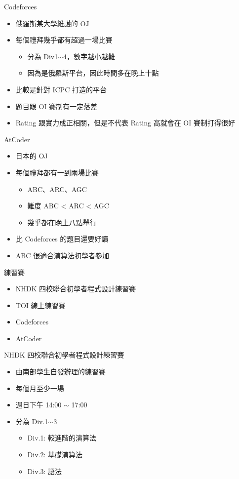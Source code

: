 \documentclass[aspectratio=169]{beamer}
\begin{document}
	\begin{frame}{Codeforces}
		\begin{itemize}
			\item 俄羅斯某大學維護的 OJ
			\item 每個禮拜幾乎都有超過一場比賽
				\begin{itemize}
					\item 分為 Div1$\sim$4，數字越小越難
					\item 因為是俄羅斯平台，因此時間多在晚上十點
				\end{itemize}
			\item 比較是針對 ICPC 打造的平台
			\item 題目跟 OI 賽制有一定落差 
			\item Rating 跟實力成正相關，但是不代表 Rating 高就會在 OI 賽制打得很好
		\end{itemize}
	\end{frame}

	\begin{frame}{AtCoder}
		\begin{itemize}
			\item 日本的 OJ
			\item 每個禮拜都有一到兩場比賽
				\begin{itemize}
					\item ABC、ARC、AGC
					\item 難度 ABC < ARC < AGC
					\item 幾乎都在晚上八點舉行
				\end{itemize}
			\item 比 Codeforces 的題目還要好讀
			\item ABC 很適合演算法初學者參加
		\end{itemize}
	\end{frame}

	\begin{frame}{練習賽}
		\begin{itemize}
			\item NHDK 四校聯合初學者程式設計練習賽
			\item TOI 線上練習賽
			\item Codeforces
			\item AtCoder
		\end{itemize}
	\end{frame}

	\begin{frame}{NHDK 四校聯合初學者程式設計練習賽}
		\begin{itemize}
			\item 由南部學生自發辦理的練習賽
			\item 每個月至少一場
			\item 週日下午 14:00 $\sim$ 17:00
			\item 分為 Div.1$\sim$3
				\begin{itemize}
					\item Div.1: 較進階的演算法
					\item Div.2: 基礎演算法
					\item Div.3: 語法
				\end{itemize}
		\end{itemize}
	\end{frame}
\end{document}
